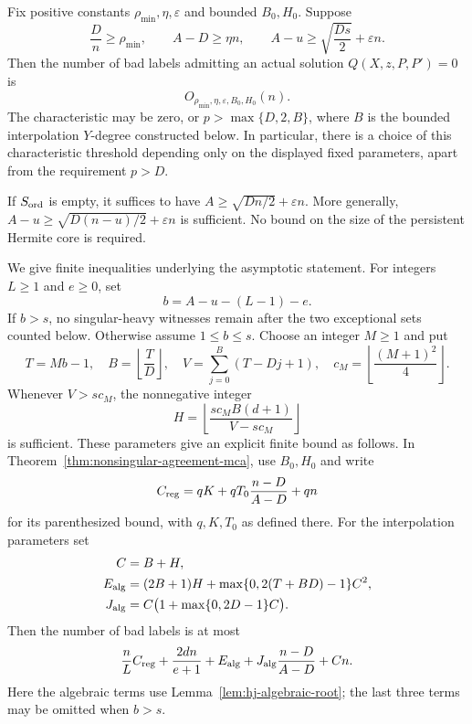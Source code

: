 \begin{theorem}
\label{thm:hermite-johnson-quadratic}
Fix positive constants $\rho_{\min},\eta,\varepsilon$ and bounded
$B_0,H_0$.  Suppose
\begin{equation}
 \frac Dn\ge\rho_{\min},\qquad
 A-D\ge\eta n,\qquad
 A-u\ge\sqrt{\frac{Ds}{2}}+\varepsilon n.
 \label{eq:hj-signed-margin}
\end{equation}
Then the number of bad labels admitting an actual solution
$Q(X,z,P,P')=0$ is
\[
 O_{\rho_{\min},\eta,\varepsilon,B_0,H_0}(n).
\]
The characteristic may be zero, or $p>\max\{D,2,B\}$, where $B$ is
the bounded interpolation $Y$-degree constructed below.  In particular,
there is a choice of this characteristic threshold depending only on
the displayed fixed parameters, apart from the requirement $p>D$.

If $S_{\rm ord}$ is empty, it suffices to have
$A\ge\sqrt{Dn/2}+\varepsilon n$.  More generally,
$A-u\ge\sqrt{D(n-u)/2}+\varepsilon n$ is sufficient.
No bound on the size of the persistent Hermite core is required.
\end{theorem}

We give finite inequalities underlying the asymptotic statement.  For
integers $L\ge1$ and $e\ge0$, set
\[
 b=A-u-(L-1)-e.
\]
If $b>s$, no singular-heavy witnesses remain after the two exceptional
sets counted below.  Otherwise assume $1\le b\le s$.  Choose an integer
$M\ge1$ and put
\begin{equation}
 T=Mb-1,\quad B=\left\lfloor\frac TD\right\rfloor,\quad
 V=\sum_{j=0}^{B}(T-Dj+1),\quad
 c_M=\left\lfloor\frac{(M+1)^2}{4}\right\rfloor.
 \label{eq:hj-interpolation-parameters}
\end{equation}
Whenever $V>sc_M$, the nonnegative integer
\begin{equation}
 H=\left\lfloor\frac{sc_MB(d+1)}{V-sc_M}\right\rfloor
 \label{eq:hj-challenge-degree}
\end{equation}
is sufficient.  These parameters give an explicit finite bound as
follows.  In Theorem~\ref{thm:nonsingular-agreement-mca}, use $B_0,H_0$
and write
\[
 C_{\rm reg}=qK+qT_0\frac{n-D}{A-D}+qn
\]
for its parenthesized bound, with $q,K,T_0$ as defined there.
For the interpolation parameters set
\begin{align*}
 C&=B+H,\\
 E_{\rm alg}&=(2B+1)H+
             \max\{0,2(T+BD)-1\}C^2,\\
 J_{\rm alg}&=C\bigl(1+\max\{0,2D-1\}C\bigr).
\end{align*}
Then the number of bad labels is at most
\begin{equation}
 \frac nL C_{\rm reg}+\frac{2dn}{e+1}
 +E_{\rm alg}+J_{\rm alg}\frac{n-D}{A-D}+Cn.
 \label{eq:hj-finite-bound}
\end{equation}
Here the algebraic terms use Lemma~\ref{lem:hj-algebraic-root}; the
last three terms may be omitted when $b>s$.

